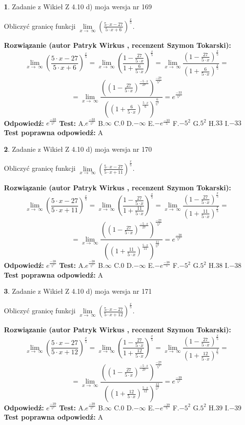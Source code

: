 \documentclass[12pt, a4paper]{article}
\theoremstyle{definition} %
\newtheorem{zad}{}
\newcommand{\zadStart}[1]{\begin{zad}#1\newline}
\newcommand{\zadStop}{\end{zad}}
\newcommand{\rozwStart}[2]{\noindent \textbf{Rozwiązanie (autor #1 , recenzent #2): }\newline}
\newcommand{\rozwStop}{\newline}
\newcommand{\odpStart}{\noindent \textbf{Odpowiedź:}\newline}
\newcommand{\odpStop}{\newline}
\newcommand{\testStart}{\noindent \textbf{Test:}\newline}
\newcommand{\testStop}{\newline}
\newcommand{\kluczStart}{\noindent \textbf{Test poprawna odpowiedź:}\newline}
\newcommand{\kluczStop}{\newline}
\begin{document}
\zadStart{Zadanie z Wikieł Z 4.10 d) moja wersja nr 169}


Obliczyć granicę funkcji  $\lim\limits_{x\to\ \infty}(\frac{5\cdot x-27}{5\cdot x+6})^{\frac{x}{5}}$.
\zadStop
\rozwStart{Patryk Wirkus}{Szymon Tokarski}
$$\lim\limits_{x\to\ \infty}(\frac{5\cdot x-27}{5\cdot x+6})^{\frac{x}{5}} = \lim\limits_{x\to\ \infty}(\frac{1-\frac{27}{5\cdot x}}{1+\frac{6}{5\cdot x}})^{\frac{x}{5}}=\lim\limits_{x\to\ \infty}\frac{(1-\frac{27}{5\cdot x})^{\frac{x}{5}}}{(1+\frac{6}{5\cdot x})^{\frac{x}{5}}}=$$
$$=\lim\limits_{x\to\ \infty}\frac{((1-\frac{27}{5\cdot x})^{\frac{-5\cdot x}{27}})^{\frac{-27}{5^{2}}}}{((1+\frac{6}{5\cdot x})^{\frac{5\cdot x}{6}})^{\frac{6}{5^{2}}}}=e^{\frac{-33}{5^{2}}}$$
\rozwStop
\odpStart
$e^{\frac{-33}{5^{2}}}$
\odpStop
\testStart
A.$e^{\frac{-33}{5^{2}}}$ B.$\infty$ C.$0$ D.$-\infty$ E.$-e^{\frac{-33}{5}}$
F.$-5^{2}$ G.$5^{2}$
H.$33$
I.$-33$
\testStop
\kluczStart
A
\kluczStop



\zadStart{Zadanie z Wikieł Z 4.10 d) moja wersja nr 170}


Obliczyć granicę funkcji  $\lim\limits_{x\to\ \infty}(\frac{5\cdot x-27}{5\cdot x+11})^{\frac{x}{5}}$.
\zadStop
\rozwStart{Patryk Wirkus}{Szymon Tokarski}
$$\lim\limits_{x\to\ \infty}(\frac{5\cdot x-27}{5\cdot x+11})^{\frac{x}{5}} = \lim\limits_{x\to\ \infty}(\frac{1-\frac{27}{5\cdot x}}{1+\frac{11}{5\cdot x}})^{\frac{x}{5}}=\lim\limits_{x\to\ \infty}\frac{(1-\frac{27}{5\cdot x})^{\frac{x}{5}}}{(1+\frac{11}{5\cdot x})^{\frac{x}{5}}}=$$
$$=\lim\limits_{x\to\ \infty}\frac{((1-\frac{27}{5\cdot x})^{\frac{-5\cdot x}{27}})^{\frac{-27}{5^{2}}}}{((1+\frac{11}{5\cdot x})^{\frac{5\cdot x}{11}})^{\frac{11}{5^{2}}}}=e^{\frac{-38}{5^{2}}}$$
\rozwStop
\odpStart
$e^{\frac{-38}{5^{2}}}$
\odpStop
\testStart
A.$e^{\frac{-38}{5^{2}}}$ B.$\infty$ C.$0$ D.$-\infty$ E.$-e^{\frac{-38}{5}}$
F.$-5^{2}$ G.$5^{2}$
H.$38$
I.$-38$
\testStop
\kluczStart
A
\kluczStop



\zadStart{Zadanie z Wikieł Z 4.10 d) moja wersja nr 171}


Obliczyć granicę funkcji  $\lim\limits_{x\to\ \infty}(\frac{5\cdot x-27}{5\cdot x+12})^{\frac{x}{5}}$.
\zadStop
\rozwStart{Patryk Wirkus}{Szymon Tokarski}
$$\lim\limits_{x\to\ \infty}(\frac{5\cdot x-27}{5\cdot x+12})^{\frac{x}{5}} = \lim\limits_{x\to\ \infty}(\frac{1-\frac{27}{5\cdot x}}{1+\frac{12}{5\cdot x}})^{\frac{x}{5}}=\lim\limits_{x\to\ \infty}\frac{(1-\frac{27}{5\cdot x})^{\frac{x}{5}}}{(1+\frac{12}{5\cdot x})^{\frac{x}{5}}}=$$
$$=\lim\limits_{x\to\ \infty}\frac{((1-\frac{27}{5\cdot x})^{\frac{-5\cdot x}{27}})^{\frac{-27}{5^{2}}}}{((1+\frac{12}{5\cdot x})^{\frac{5\cdot x}{12}})^{\frac{12}{5^{2}}}}=e^{\frac{-39}{5^{2}}}$$
\rozwStop
\odpStart
$e^{\frac{-39}{5^{2}}}$
\odpStop
\testStart
A.$e^{\frac{-39}{5^{2}}}$ B.$\infty$ C.$0$ D.$-\infty$ E.$-e^{\frac{-39}{5}}$
F.$-5^{2}$ G.$5^{2}$
H.$39$
I.$-39$
\testStop
\kluczStart
A
\kluczStop
\end{document}
